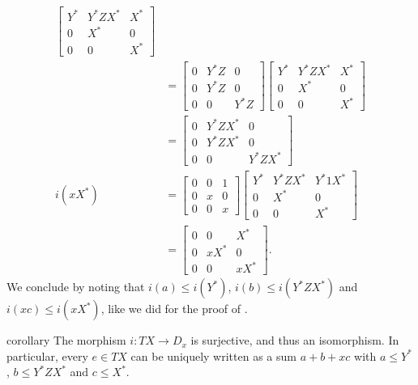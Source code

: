 \documentclass[a4paper,UKenglish,cleveref, autoref, thm-restate]{lipics-v2021}
\begin{document}
\begin{proofEnd}
\begin{align*}
      \begin{bmatrix}
        Y^* & Y^*ZX^* & X^* \\
        0 & X^* & 0 \\
        0 & 0 & X^*
      \end{bmatrix}
    \\
    & =
      \begin{bmatrix}
        0 & Y^*Z & 0 \\
        0 & Y^*Z & 0 \\
        0 & 0 & Y^*Z
      \end{bmatrix}
      \begin{bmatrix}
        Y^* & Y^*ZX^* & X^* \\
        0 & X^* & 0 \\
        0 & 0 & X^*
      \end{bmatrix}
    \\
    & =
      \begin{bmatrix}
        0 & Y^*ZX^* & 0 \\
        0 & Y^*ZX^* & 0 \\
        0 & 0 & Y^*ZX^*
      \end{bmatrix}
    \\ i(xX^*)
    & =
      \begin{bmatrix}
        0 & 0 & 1 \\
        0 & x & 0 \\
        0 & 0 & x
      \end{bmatrix}
      \begin{bmatrix}
        Y^* & Y^*ZX^* & Y^*1X^* \\
        0 & X^* & 0 \\
        0 & 0 & X^*
      \end{bmatrix}
    \\
    & =
      \begin{bmatrix}
        0 & 0 & X^* \\
        0 & xX^* & 0 \\
        0 & 0 & xX^*
      \end{bmatrix}.
  \end{align*}
  We conclude by noting that $i(a)  \leq  i(Y^*)$, $i(b)  \leq  i(Y^*ZX^*)$ and $i(xc)  \leq 
  i(xX^*)$, like we did for the proof of .
\end{proofEnd}

\begin{theoremEnd}{corollary}
  \label{cor:derivative-decomposition-unique}
  The morphism $i : TX  \to  D_x$ is surjective, and thus an isomorphism.  In
  particular, every $e  \in  TX$ can be uniquely written as a sum $a + b + xc$ with
  $a  \leq  Y^*$, $b  \leq  Y^*ZX^*$ and $c  \leq  X^*$.
\end{theoremEnd}
\end{document}

